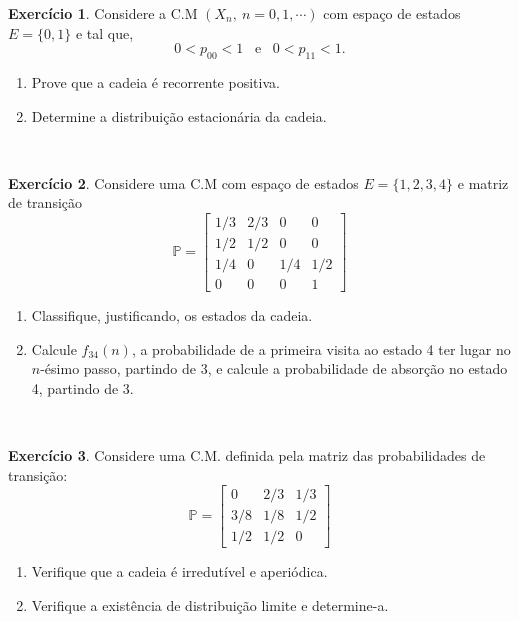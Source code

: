 \documentclass[
  11pt,
  a4paper,
]{book}
\theoremstyle{definition}
\theoremstyle{definition}
\theoremstyle{definition}
\newtheorem{exercise}{Exercício}[chapter]
\theoremstyle{definition}
\theoremstyle{remark}
\begin{document}
\begin{exercise}
\leavevmode

Considere a C.M \((X_{n}, ~n=0,1,\cdots )\) com espaço de estados \(E=\{0,1\}\) e tal que,
\[
0<p_{00}<1\;\;\;\mathrm{e}\;\;\;0<p_{11}<1.
\]

\begin{enumerate}
\def\labelenumi{(\alph{enumi})}
\item
  Prove que a cadeia é recorrente positiva.
\item
  Determine a distribuição estacionária da cadeia.
\end{enumerate}

\end{exercise}

\(\,\)

\begin{exercise}
\leavevmode

Considere uma C.M com espaço de
estados \(E=\{1,2,3,4\}\) e matriz de transição
\[
\mathbb{P}=\left[
\begin{array}{cccc}
1/3 & 2/3 & 0 & 0 \\
1/2 & 1/2 & 0 & 0 \\
1/4 & 0 & 1/4 & 1/2 \\
0 & 0 & 0 & 1%
\end{array}
\right]
\]

\begin{enumerate}
\def\labelenumi{(\alph{enumi})}
\item
  Classifique, justificando, os estados da cadeia.
\item
  Calcule \(f_{34}(n)\), a probabilidade de a primeira
  visita ao estado 4 ter lugar no \(n\)-ésimo passo, partindo de 3, e
  calcule a probabilidade de absorção no estado 4, partindo de 3.
\end{enumerate}

\end{exercise}

\(\,\)

\begin{exercise}
\leavevmode

Considere uma C.M. definida pela matriz das probabilidades
de transição:
\[
\mathbb{P}=\left[
\begin{array}{ccc}
0 & 2/3 & 1/3 \\
3/8 & 1/8 & 1/2 \\
1/2 & 1/2 & 0%
\end{array}
\right]
\]

\begin{enumerate}
\def\labelenumi{(\alph{enumi})}
\item
  Verifique que a cadeia é irredutível e aperiódica.
\item
  Verifique a existência de distribuição limite e determine-a.
\end{enumerate}

\end{exercise}
\end{document}
